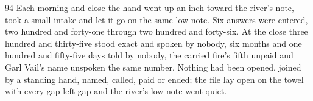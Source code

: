 \begin{CRchronicle}{94}
Each morning and close the hand went up an inch toward the river’s note, took a small intake and let it go on the same low note. Six answers were entered, two hundred and forty-one through two hundred and forty-six. At the close three hundred and thirty-five stood exact and spoken by nobody, six months and one hundred and fifty-five days told by nobody, the carried fire’s fifth unpaid and Garl Vail’s name unspoken the same number. Nothing had been opened, joined by a standing hand, named, called, paid or ended; the file lay open on the towel with every gap left gap and the river’s low note went quiet.
\end{CRchronicle}
